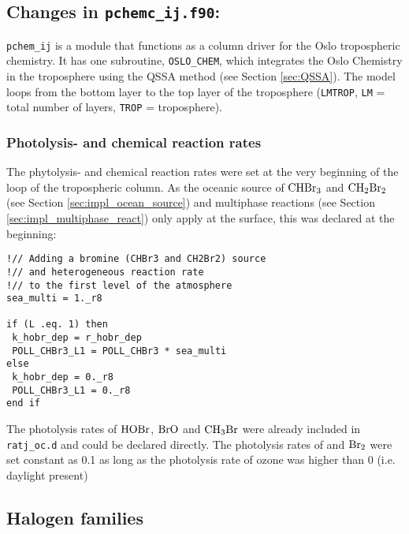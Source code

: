


\subsection{Changes in \texttt{pchemc\_ij.f90}:}

\texttt{pchem\_ij} is a module that functions as a column driver for the Oslo tropospheric chemistry. It has one subroutine, \texttt{OSLO\_CHEM}, which integrates the Oslo Chemistry in the troposphere using the QSSA method (see Section \ref{sec:QSSA}). The model loops from the bottom layer to the top layer of the troposphere (\texttt{LMTROP}, \texttt{LM} = total number of layers, \texttt{TROP} = troposphere). 

\subsubsection{Photolysis- and chemical reaction rates}

The phytolysis- and chemical reaction rates were set at the very beginning of the loop of the tropospheric column. As the oceanic source of $\mathrm{CHBr_3}$ and $\mathrm{CH_2Br_2}$ (see Section \ref{sec:impl_ocean_source}) and multiphase reactions (see Section \ref{sec:impl_multiphase_react}) only apply at the surface, this was declared at the beginning:

\begin{lstlisting}
!// Adding a bromine (CHBr3 and CH2Br2) source 
!// and heterogeneous reaction rate 
!// to the first level of the atmosphere
sea_multi = 1._r8

if (L .eq. 1) then
 k_hobr_dep = r_hobr_dep
 POLL_CHBr3_L1 = POLL_CHBr3 * sea_multi
else
 k_hobr_dep = 0._r8
 POLL_CHBr3_L1 = 0._r8
end if
\end{lstlisting}


The photolysis rates of $\mathrm{HOBr}$, $\mathrm{BrO}$ and $\mathrm{CH_3Br}$ were already included in \texttt{ratj\_oc.d} and could be declared directly. The photolysis rates of  and $\mathrm{Br_2}$ were set constant as 0.1 as long as the photolysis rate of ozone was higher than 0 (i.e. daylight present)


\subsection{Halogen families}

